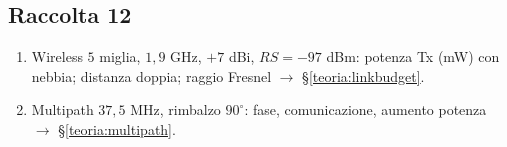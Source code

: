 \documentclass[11pt,a4paper]{report}
\begin{document}
\subsection*{Raccolta 12}
\begin{enumerate}[noitemsep]
\item Wireless $5$ miglia, $1{,}9$ GHz, $+7$ dBi, $RS=-97$ dBm: potenza Tx (mW) con nebbia; distanza doppia; raggio Fresnel $\to$ \S\ref{teoria:linkbudget}.
\item Multipath $37{,}5$ MHz, rimbalzo $90^\circ$: fase, comunicazione, aumento potenza $\to$ \S\ref{teoria:multipath}.
\end{enumerate}

\normalsize
\renewcommand{\arraystretch}{1}

\cleardoublepage
{}
\printindex
\end{document}
